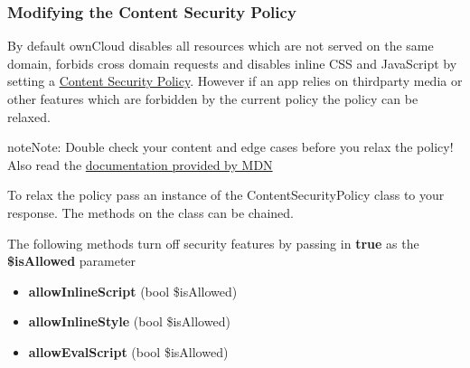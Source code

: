 \documentclass[letterpaper,10pt,english]{sphinxmanual}
\begin{document}
\subsubsection{Modifying the Content Security Policy}
\label{app/controllers:modifying-the-content-security-policy}

By default ownCloud disables all resources which are not served on the same domain, forbids cross domain requests and disables inline CSS and JavaScript by setting a \href{https://developer.mozilla.org/en-US/docs/Web/Security/CSP/Introducing\_Content\_Security\_Policy}{Content Security Policy}. However if an app relies on thirdparty media or other features which are forbidden by the current policy the policy can be relaxed.

\begin{notice}{note}{Note:}
Double check your content and edge cases before you relax the policy! Also read the \href{https://developer.mozilla.org/en-US/docs/Web/Security/CSP/Introducing\_Content\_Security\_Policy}{documentation provided by MDN}
\end{notice}

To relax the policy pass an instance of the ContentSecurityPolicy class to your response. The methods on the class can be chained.

The following methods turn off security features by passing in \textbf{true} as the \textbf{\$isAllowed} parameter
\begin{itemize}
\item {} 
\textbf{allowInlineScript} (bool \$isAllowed)

\item {} 
\textbf{allowInlineStyle} (bool \$isAllowed)

\item {} 
\textbf{allowEvalScript} (bool \$isAllowed)

\end{itemize}
\end{document}

